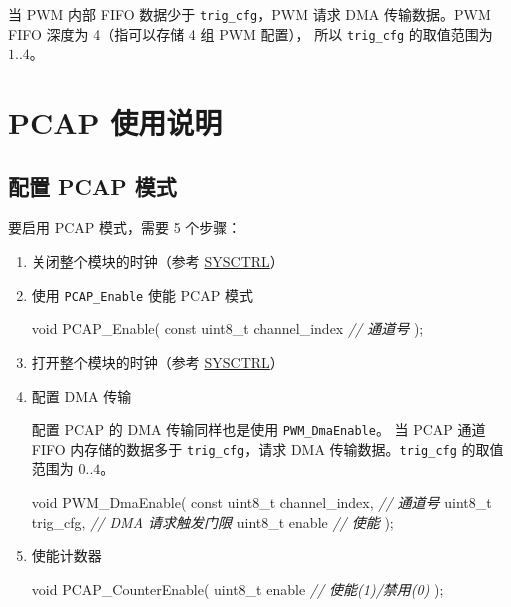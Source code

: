 \documentclass[
  12pt,
]{book}
\newenvironment{Shaded}{\begin{snugshade}}{\end{snugshade}}
\newcommand{\CommentTok}[1]{\textcolor[rgb]{0.56,0.35,0.01}{\textit{#1}}}
\newcommand{\DataTypeTok}[1]{\textcolor[rgb]{0.13,0.29,0.53}{#1}}
\newcommand{\NormalTok}[1]{#1}
\begin{document}
当 PWM 内部 FIFO 数据少于 \texttt{trig\_cfg}，PWM 请求 DMA 传输数据。PWM FIFO 深度为 4（指可以存储 4 组 PWM 配置），
所以 \texttt{trig\_cfg} 的取值范围为 \(1..4\)。

\hypertarget{pcap-ux4f7fux7528ux8bf4ux660e}{%
\section{PCAP 使用说明}\label{pcap-ux4f7fux7528ux8bf4ux660e}}

\hypertarget{ux914dux7f6e-pcap-ux6a21ux5f0f}{%
\subsection{配置 PCAP 模式}\label{ux914dux7f6e-pcap-ux6a21ux5f0f}}

要启用 PCAP 模式，需要 5 个步骤：

\begin{enumerate}
\def\labelenumi{\arabic{enumi}.}
\item
  关闭整个模块的时钟（参考 \protect\hyperlink{ch-sysctrl}{SYSCTRL}）
\item
  使用 \texttt{PCAP\_Enable} 使能 PCAP 模式

\begin{Shaded}
\begin{Highlighting}[]
\DataTypeTok{void}\NormalTok{ PCAP_Enable(}
    \DataTypeTok{const} \DataTypeTok{uint8_t}\NormalTok{ channel_index     }\CommentTok{// 通道号}
\NormalTok{);}
\end{Highlighting}
\end{Shaded}
\item
  打开整个模块的时钟（参考 \protect\hyperlink{ch-sysctrl}{SYSCTRL}）
\item
  配置 DMA 传输

  配置 PCAP 的 DMA 传输同样也是使用 \texttt{PWM\_DmaEnable}。
  当 PCAP 通道 FIFO 内存储的数据多于 \texttt{trig\_cfg}，请求 DMA 传输数据。\texttt{trig\_cfg} 的取值范围为 \(0..4\)。

\begin{Shaded}
\begin{Highlighting}[]
\DataTypeTok{void}\NormalTok{ PWM_DmaEnable(}
    \DataTypeTok{const} \DataTypeTok{uint8_t}\NormalTok{ channel_index, }\CommentTok{// 通道号}
    \DataTypeTok{uint8_t}\NormalTok{ trig_cfg,            }\CommentTok{// DMA 请求触发门限}
    \DataTypeTok{uint8_t}\NormalTok{ enable               }\CommentTok{// 使能}
\NormalTok{    );}
\end{Highlighting}
\end{Shaded}
\item
  使能计数器

\begin{Shaded}
\begin{Highlighting}[]
\DataTypeTok{void}\NormalTok{ PCAP_CounterEnable(}
    \DataTypeTok{uint8_t}\NormalTok{ enable              }\CommentTok{// 使能(1)/禁用(0)}
\NormalTok{    );}
\end{Highlighting}
\end{Shaded}
\end{enumerate}
\end{document}
